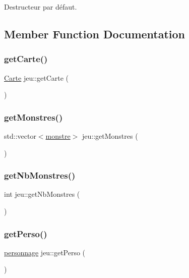 Destructeur par défaut. 



\subsection{Member Function Documentation}
\mbox{\label{classjeu_ae2e46e1fdeb23fc643ed506b0df7f21f}} 
\subsubsection{\texorpdfstring{get\+Carte()}{getCarte()}}
{\footnotesize\ttfamily \hyperlink{class_carte}{Carte} jeu\+::get\+Carte (\begin{DoxyParamCaption}{ }\end{DoxyParamCaption})}

\mbox{\label{classjeu_a22e7a7e7b932b935fa73658820038176}} 
\subsubsection{\texorpdfstring{get\+Monstres()}{getMonstres()}}
{\footnotesize\ttfamily std\+::vector$<$\hyperlink{classmonstre}{monstre}$>$ jeu\+::get\+Monstres (\begin{DoxyParamCaption}{ }\end{DoxyParamCaption})}

\mbox{\label{classjeu_ae172cfaf3e5c97e1576dc4069d48ec94}} 
\subsubsection{\texorpdfstring{get\+Nb\+Monstres()}{getNbMonstres()}}
{\footnotesize\ttfamily int jeu\+::get\+Nb\+Monstres (\begin{DoxyParamCaption}{ }\end{DoxyParamCaption})}

\mbox{\label{classjeu_a8bd58d1469db0d7595bb732403036823}} 
\subsubsection{\texorpdfstring{get\+Perso()}{getPerso()}}
{\footnotesize\ttfamily \hyperlink{classpersonnage}{personnage} jeu\+::get\+Perso (\begin{DoxyParamCaption}{ }\end{DoxyParamCaption})}

